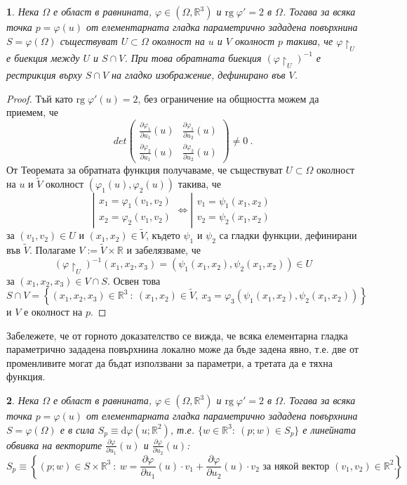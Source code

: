 \documentclass[11pt]{article}
\numberwithin{equation}{section}
\numberwithin{figure}{section}
\numberwithin{table}{section}
\theoremstyle{plain}
\newtheorem{thm}{\protect\theoremname}[section]
\theoremstyle{definition}
\theoremstyle{remark}
\theoremstyle{definition}
\theoremstyle{remark}
\theoremstyle{plain}
\newtheorem{lem}[thm]{\protect\lemmaname}
\theoremstyle{definition}
\theoremstyle{definition}
\theoremstyle{plain}
\theoremstyle{plain}
\theoremstyle{plain}
\theoremstyle{definition}
\theoremstyle{plain}
\providecommand{\lemmaname}{Лема}
\providecommand{\theoremname}{Теорема}
\newcommand*{\R}{\mathbb{R}}
\begin{document}
\begin{lem}\label{explicit}
Нека $\Omega$ е област в равнината, $\varphi\in (\Omega ,\R^3)$ и $\textrm{rg}\; \varphi'=2$ в $\Omega$. Тогава за всяка точка $p=\varphi(u)$ от елементарната гладка параметрично зададена повърхнина $S=\varphi(\Omega)$ съществуват $U\subset\Omega$ околност на $u$ и $V$ околност $p$ такива, че $\varphi\restriction_{U}$ е биекция между $U$ и $S\cap V$. При това обратната биекция $\left(\varphi\restriction_{U}\right)^{-1}$ е рестрикция върху $S\cap V$ на гладко изображение, дефинирано във $V$.
\end{lem}

\begin{proof}
Тъй като $\textrm{rg} \; \varphi '(u)=2$,  без ограничение на общността можем да приемем, че
$$det\left( \begin{array}{cc}\frac{\partial\varphi_1}{\partial u_1}(u)&\frac{\partial\varphi_1}{\partial u_2}(u)\\ \frac{\partial\varphi_2}{\partial u_1}(u)&\frac{\partial\varphi_2}{\partial u_2}(u)\end{array}\right)\not = 0 \ .$$
От Теоремата за обратната функция получаваме, че съществуват $U\subset\Omega$ околност на $u$ и $\tilde{V}$ околност $(\varphi_1(u),\varphi_2(u))$ такива, че
$$\left| \begin{array}{c}x_1=\varphi_1(v_1,v_2)\\ x_2=\varphi_2(v_1,v_2)\end{array}\right. \Leftrightarrow
\left| \begin{array}{c}v_1=\psi_1(x_1,x_2)\\ v_2=\psi_2(x_1,x_2)\end{array}\right.$$
за $(v_1,v_2)\in U$ и $(x_1,x_2)\in\tilde{V}$, където $\psi_1$ и $\psi_2$ са гладки функции, дефинирани във  $\tilde{V}$. Полагаме $V:= \tilde{V}\times \R$ и забелязваме, че
$$\left(\varphi\restriction_{U}\right)^{-1}(x_1,x_2,x_3)=(\psi_1(x_1,x_2),\psi_2(x_1,x_2))\in U$$
за $(x_1,x_2,x_3)\in {V}\cap S$. Освен това
$$S\cap V =\left\{ (x_1,x_2,x_3)\in \R^3 \ : \  (x_1,x_2)\in \tilde{V}, \ x_3=\varphi_3(\psi_1(x_1,x_2),\psi_2(x_1,x_2))\right\}$$
и $V$ е околност на $p$.
\end{proof}

Забележете, че от горното доказателство се вижда, че всяка елементарна гладка параметрично зададена повърхнина локално може да бъде задена явно, т.е. две от променливите могат да бъдат използвани за параметри, а третата да е тяхна функция.

\begin{thm}
Нека $\Omega$ е област в равнината, $\varphi\in (\Omega ,\R^3)$ и $\textrm{rg}\; \varphi'=2$ в $\Omega$. Тогава за всяка точка $p=\varphi(u)$ от елементарната гладка параметрично зададена повърхнина $S=\varphi(\Omega)$ е в сила $S_p\equiv \textrm{d}\varphi (u;\R^2)$, т.е. $\{ w\in \R^3 : \ (p;w)\in S_p\}$ е линейната обвивка на векторите $\frac{\partial\varphi}{\partial u_1}(u)$ и $\frac{\partial\varphi}{\partial u_2}(u)$:
$$S_{p}\equiv \left\{ (p;w)\in S\times \R^3 \ : \ w=\frac{\partial\varphi}{\partial u_1}(u)\cdot v_1+\frac{\partial\varphi}{\partial u_2}(u)\cdot v_2 \mbox{ за някой вектор } (v_1,v_2)\in \R^2\right\} \ .$$
\end{thm}
\end{document}
